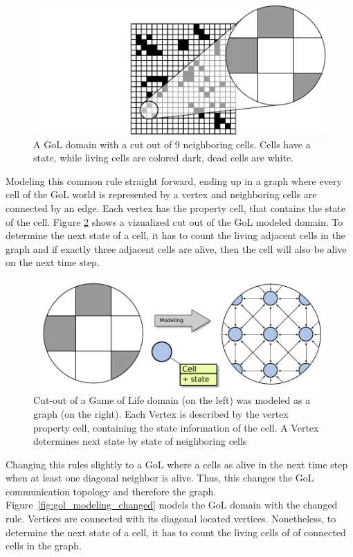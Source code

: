 \begin{figure}[H]
  \centering \includegraphics[width=\textwidth]{graphics/30_gol_simulation}
  \caption{A GoL domain with a cut out of 9 neighboring cells. Cells have
  a state, while living cells are colored dark, dead cells are white.}
  \label{fig:gol_simulation}
\end{figure}

Modeling this common rule straight forward, ending up in a graph where
every cell of the GoL world is represented by a vertex and neighboring
cells are connected by an edge. Each vertex has the property cell, that
contains the state of the cell. Figure \ref{fig:gol_modeling} shows a vizualized
cut out of the GoL modeled domain. To determine the next state of a 
cell, it has to count the living adjacent cells in the graph and if
exactly three adjacent cells are alive, then the cell will also be
alive on the next time step.

\begin{figure}[H]
  \centering \includegraphics[width=\textwidth]{graphics/30_gol_modeling}
  \caption{Cut-out of a Game of Life domain (on the left) was modeled
    as a graph (on the right). Each Vertex is described by the vertex
    property cell, containing the state information of the cell. A
    Vertex determines next state by state of neighboring cells}
  \label{fig:gol_modeling}
\end{figure}

Changing this rules slightly to a GoL where a cells as alive in the
next time step when at least one diagonal neighbor is alive.  Thus,
this changes the GoL communication topology and therefore the
graph. Figure~\ref{fig:gol_modeling_changed} models the GoL domain
with the changed rule. Vertices are connected with its diagonal
located vertices. Nonetheless, to determine the next state of a cell,
it has to count the living cells of of connected cells in the graph.

